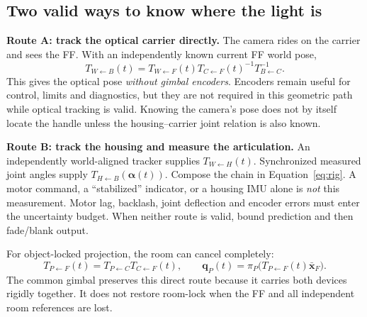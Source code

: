\documentclass[11pt,a4paper]{article}
\newcommand{\T}[2]{T_{#1\leftarrow #2}}
\newcommand{\hpt}[1]{\bar{\bm{x}}_{#1}}
\begin{document}
\subsection{Two valid ways to know where the light is}
\textbf{Route A: track the optical carrier directly.}
The camera rides on the carrier and sees the FF.
With an independently known current FF world pose,
\begin{equation}
\T{W}{B}(t)=
\T{W}{F}(t)\T{C}{F}(t)^{-1}\T{B}{C}^{-1}.
\label{eq:body}
\end{equation}
This gives the optical pose \emph{without gimbal encoders}.
Encoders remain useful for control, limits and diagnostics, but they are
not required in this geometric path while optical tracking is valid.
Knowing the camera's pose does not by itself locate the handle unless
the housing--carrier joint relation is also known.

\textbf{Route B: track the housing and measure the articulation.}
An independently world-aligned tracker supplies $\T{W}{H}(t)$.
Synchronized measured joint angles supply
$\T{H}{B}(\bm{\alpha}(t))$.
Compose the chain in Equation~\eqref{eq:rig}.
A motor command, a ``stabilized'' indicator, or a housing IMU alone is
\emph{not} this measurement. Motor lag, backlash, joint deflection and
encoder errors must enter the uncertainty budget.
When neither route is valid, bound prediction and then fade/blank output.

For object-locked projection, the room can cancel completely:
\begin{equation}
\T{P}{F}(t)=\T{P}{C}\T{C}{F}(t),\qquad
\bm{q}_{P}(t)=\pi_P\bigl(\T{P}{F}(t)\hpt{F}\bigr).
\label{eq:direct}
\end{equation}
The common gimbal preserves this direct route because it carries both
devices rigidly together. It does not restore room-lock when the FF and
all independent room references are lost.
\end{document}
